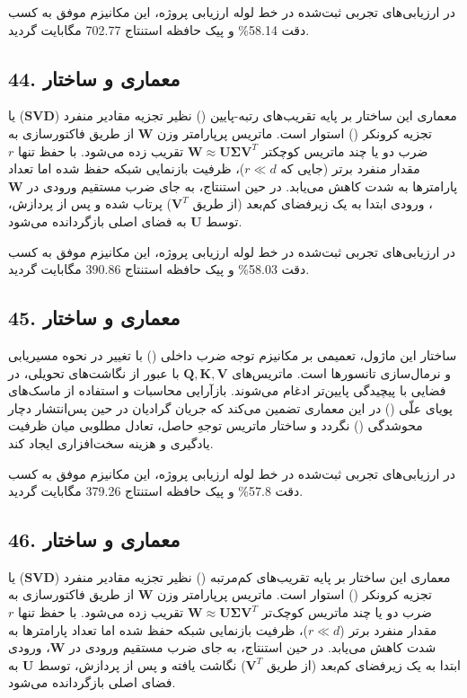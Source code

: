 \documentclass[12pt,a4paper]{report}
\theoremstyle{definition}
\begin{document}
در ارزیابی‌های تجربی ثبت‌شده در خط لوله ارزیابی پروژه، این مکانیزم موفق به کسب دقت 58.14\% و پیک حافظه استنتاج 702.77 مگابایت گردید.

\subsection*{44. معماری و ساختار }
معماری این ساختار بر پایه تقریب‌های رتبه-پایین () نظیر تجزیه مقادیر منفرد ($\mathbf{SVD}$) یا تجزیه کرونکر () استوار است. ماتریس پرپارامتر وزن $\mathbf{W}$ از طریق فاکتورسازی به ضرب دو یا چند ماتریس کوچکتر $\mathbf{W} \approx \mathbf{U} \mathbf{\Sigma} \mathbf{V}^T$ تقریب زده می‌شود. با حفظ تنها $r$ مقدار منفرد برتر (جایی که $r \ll d$)، ظرفیت بازنمایی شبکه حفظ شده اما تعداد پارامترها به شدت کاهش می‌یابد. در حین استنتاج، به جای ضرب مستقیم ورودی در $\mathbf{W}$، ورودی ابتدا به یک زیرفضای کم‌بعد (از طریق $\mathbf{V}^T$) پرتاب شده و پس از پردازش، توسط $\mathbf{U}$ به فضای اصلی بازگردانده می‌شود.

در ارزیابی‌های تجربی ثبت‌شده در خط لوله ارزیابی پروژه، این مکانیزم موفق به کسب دقت 58.03\% و پیک حافظه استنتاج 390.86 مگابایت گردید.

\subsection*{45. معماری و ساختار }
ساختار این ماژول، تعمیمی بر مکانیزم توجه ضرب داخلی () با تغییر در نحوه مسیریابی و نرمال‌سازی تانسورها است. ماتریس‌های $\mathbf{Q, K, V}$ با عبور از نگاشت‌های تحویلی، در فضایی با پیچیدگی پایین‌تر ادغام می‌شوند. بازآرایی محاسبات و استفاده از ماسک‌های پویای علّی () در این معماری تضمین می‌کند که جریان گرادیان در حین پس‌انتشار دچار محوشدگی () نگردد و ساختار ماتریس توجهِ حاصل، تعادل مطلوبی میان ظرفیت یادگیری و هزینه سخت‌افزاری ایجاد کند.

در ارزیابی‌های تجربی ثبت‌شده در خط لوله ارزیابی پروژه، این مکانیزم موفق به کسب دقت 57.8\% و پیک حافظه استنتاج 379.26 مگابایت گردید.

\subsection*{46. معماری و ساختار }
معماری این ساختار بر پایه تقریب‌های کم‌مرتبه () نظیر تجزیه مقادیر منفرد ($\mathbf{SVD}$) یا تجزیه کرونکر () استوار است. ماتریس پرپارامتر وزن $\mathbf{W}$ از طریق فاکتورسازی به ضرب دو یا چند ماتریس کوچک‌تر $\mathbf{W} \approx \mathbf{U} \mathbf{\Sigma} \mathbf{V}^T$ تقریب زده می‌شود. با حفظ تنها $r$ مقدار منفرد برتر ($r \ll d$)، ظرفیت بازنمایی شبکه حفظ شده اما تعداد پارامترها به شدت کاهش می‌یابد. در حین استنتاج، به جای ضرب مستقیم ورودی در $\mathbf{W}$، ورودی ابتدا به یک زیرفضای کم‌بعد (از طریق $\mathbf{V}^T$) نگاشت یافته و پس از پردازش، توسط $\mathbf{U}$ به فضای اصلی بازگردانده می‌شود.
\end{document}
